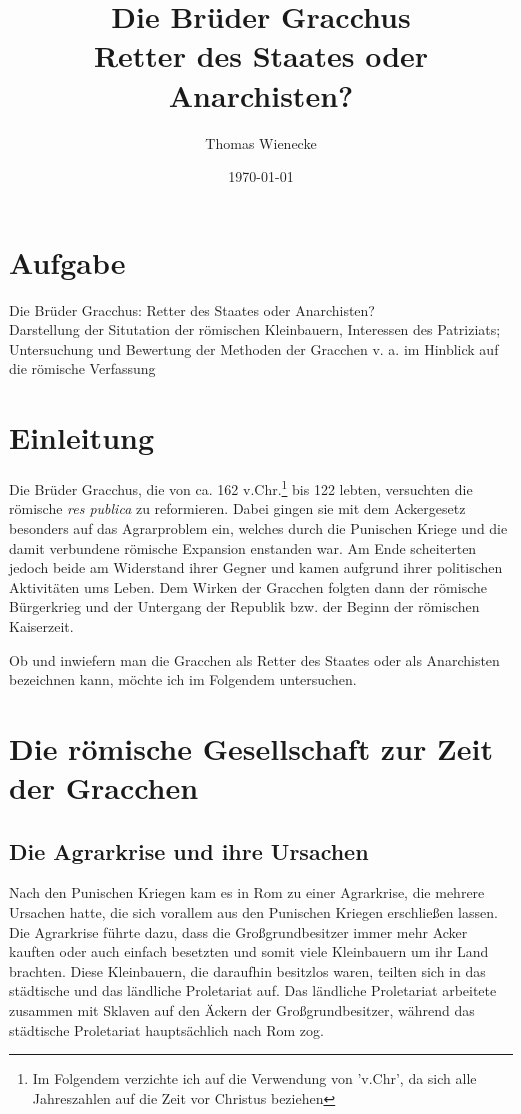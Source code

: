 \documentclass[
    12pt,
    smallheadings,
    ]{scrreprt}
\begin{document}
\title{Die Brüder Gracchus \\
Retter des Staates oder Anarchisten?}
\author{Thomas Wienecke}
\date{\today}
\maketitle

\renewcommand*{\chapterpagestyle}{empty}
\tableofcontents
\clearpage

\renewcommand*{\chapterpagestyle}{plain}

\chapter{Aufgabe}
Die Brüder Gracchus: Retter des Staates oder Anarchisten? \\
Darstellung der Situtation der römischen Kleinbauern, Interessen des Patriziats; Untersuchung und Bewertung der Methoden der Gracchen v. a. im Hinblick auf die römische Verfassung

\chapter{Einleitung}

Die Brüder Gracchus, die von ca. 162 v.Chr.\footnote{Im Folgendem verzichte ich auf die Verwendung von 'v.Chr', da sich alle Jahreszahlen auf die Zeit vor Christus beziehen}
bis 122 lebten, versuchten die römische \textit{res publica} zu reformieren.
Dabei gingen sie mit dem Ackergesetz besonders auf das Agrarproblem ein, welches durch die Punischen Kriege und die damit verbundene römische Expansion enstanden war.
Am Ende scheiterten jedoch beide am Widerstand ihrer Gegner und kamen aufgrund ihrer politischen Aktivitäten ums Leben.
Dem Wirken der Gracchen folgten dann der römische Bürgerkrieg und der Untergang der Republik bzw. der Beginn der römischen Kaiserzeit.

Ob und inwiefern man die Gracchen als Retter des Staates oder als Anarchisten bezeichnen kann, möchte ich im Folgendem untersuchen.




\chapter{Die römische Gesellschaft zur Zeit der Gracchen}
    \section{Die Agrarkrise und ihre Ursachen}
Nach den Punischen Kriegen kam es in Rom zu einer Agrarkrise, die mehrere Ursachen hatte, die sich vorallem aus den Punischen Kriegen erschließen lassen.
Die Agrarkrise führte dazu, dass die Großgrundbesitzer immer mehr Acker kauften oder auch einfach besetzten und somit viele Kleinbauern um ihr Land brachten.
Diese Kleinbauern, die daraufhin besitzlos waren, teilten sich in das städtische und das ländliche Proletariat auf.
Das ländliche Proletariat arbeitete zusammen mit Sklaven auf den Äckern der Großgrundbesitzer, während das städtische Proletariat hauptsächlich nach Rom zog.
\end{document}
